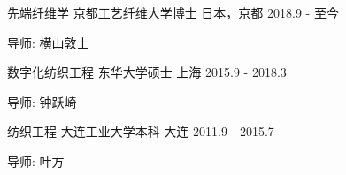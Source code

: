 
\begin{cventries}

  \cventry
    {先端纤维学} %
    {京都工艺纤维大学\quad 博士} %
    {日本，京都} %
    {2018.9 - 至今} %
    {
      \begin{cvitems} %
        \item {导师: 横山敦士}
      \end{cvitems}
    }

  \cventry
    {数字化纺织工程 } %
    {东华大学\quad 硕士} %
    {上海} %
    {2015.9 - 2018.3} %
    {
      \begin{cvitems} %
        \item {导师: 钟跃崎}
      \end{cvitems}
    }

  \cventry
    {纺织工程 } %
    {大连工业大学\quad 本科} %
    {大连} %
    {2011.9 - 2015.7} %
    {
      \begin{cvitems} %
        \item {导师: 叶方}
      \end{cvitems}
    }

\end{cventries}
